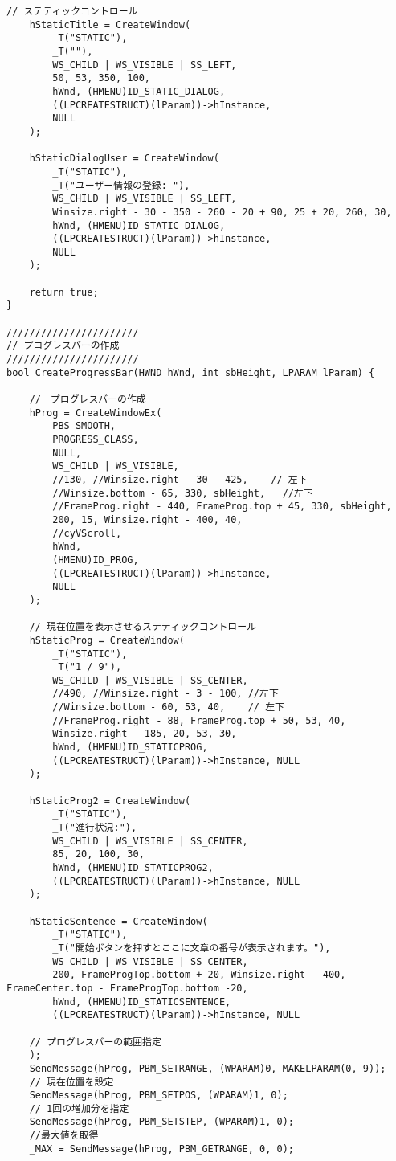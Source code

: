 \begin{lstlisting}[caption=window.cpp]
	// ステティックコントロール
	hStaticTitle = CreateWindow(
		_T("STATIC"),
		_T(""),
		WS_CHILD | WS_VISIBLE | SS_LEFT,
		50, 53, 350, 100,
		hWnd, (HMENU)ID_STATIC_DIALOG,
		((LPCREATESTRUCT)(lParam))->hInstance,
		NULL
	);

	hStaticDialogUser = CreateWindow(
		_T("STATIC"),
		_T("ユーザー情報の登録: "),
		WS_CHILD | WS_VISIBLE | SS_LEFT,
		Winsize.right - 30 - 350 - 260 - 20 + 90, 25 + 20, 260, 30,
		hWnd, (HMENU)ID_STATIC_DIALOG,
		((LPCREATESTRUCT)(lParam))->hInstance,
		NULL
	);

	return true;
}

///////////////////////
// プログレスバーの作成
///////////////////////
bool CreateProgressBar(HWND hWnd, int sbHeight, LPARAM lParam) {

	//　プログレスバーの作成
	hProg = CreateWindowEx(
		PBS_SMOOTH,
		PROGRESS_CLASS,
		NULL,           
		WS_CHILD | WS_VISIBLE,        
		//130, //Winsize.right - 30 - 425,    // 左下
		//Winsize.bottom - 65, 330, sbHeight,   //左下
		//FrameProg.right - 440, FrameProg.top + 45, 330, sbHeight,
		200, 15, Winsize.right - 400, 40,
		//cyVScroll,
		hWnd,            
		(HMENU)ID_PROG,           
		((LPCREATESTRUCT)(lParam))->hInstance,                
		NULL          
	);

	// 現在位置を表示させるステティックコントロール
	hStaticProg = CreateWindow(
		_T("STATIC"),
		_T("1 / 9"),
		WS_CHILD | WS_VISIBLE | SS_CENTER,
		//490, //Winsize.right - 3 - 100, //左下
		//Winsize.bottom - 60, 53, 40,    // 左下
		//FrameProg.right - 88, FrameProg.top + 50, 53, 40,
		Winsize.right - 185, 20, 53, 30,
		hWnd, (HMENU)ID_STATICPROG,
		((LPCREATESTRUCT)(lParam))->hInstance, NULL
	);

	hStaticProg2 = CreateWindow(
		_T("STATIC"),
		_T("進行状況:"),
		WS_CHILD | WS_VISIBLE | SS_CENTER,
		85, 20, 100, 30,
		hWnd, (HMENU)ID_STATICPROG2,
		((LPCREATESTRUCT)(lParam))->hInstance, NULL
	);

	hStaticSentence = CreateWindow(
		_T("STATIC"),
		_T("開始ボタンを押すとここに文章の番号が表示されます。"),
		WS_CHILD | WS_VISIBLE | SS_CENTER,
		200, FrameProgTop.bottom + 20, Winsize.right - 400, FrameCenter.top - FrameProgTop.bottom -20,
		hWnd, (HMENU)ID_STATICSENTENCE,
		((LPCREATESTRUCT)(lParam))->hInstance, NULL

	// プログレスバーの範囲指定
	);
	SendMessage(hProg, PBM_SETRANGE, (WPARAM)0, MAKELPARAM(0, 9));
	// 現在位置を設定  
	SendMessage(hProg, PBM_SETPOS, (WPARAM)1, 0);
	// 1回の増加分を指定
	SendMessage(hProg, PBM_SETSTEP, (WPARAM)1, 0);
	//最大値を取得
	_MAX = SendMessage(hProg, PBM_GETRANGE, 0, 0);


\end{lstlisting}
